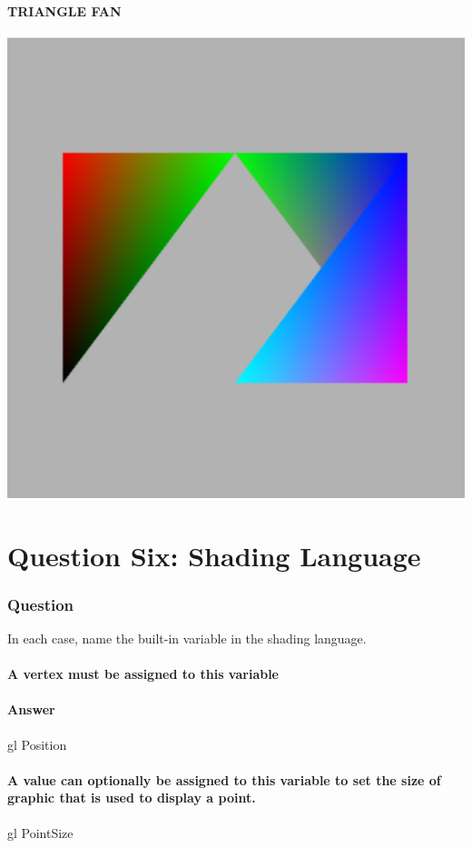 \documentclass{report}
\begin{document}
\subsection{TRIANGLE FAN}
\includegraphics[width=1.0\textwidth]{Image_6}
\part{Question Six: Shading Language}
\section{Question}
In each case, name the built-in variable in the shading language.
\subsection{ A vertex must be assigned to this variable}
\subsection{Answer}
gl Position
\subsection{ A value can optionally be assigned to this variable to set the size of graphic that is used to display a point.}
gl PointSize
\end{document}
